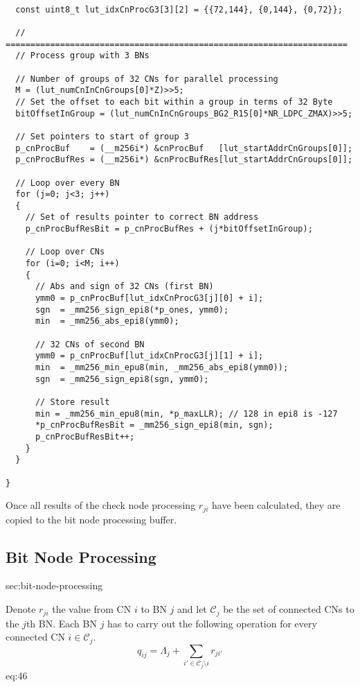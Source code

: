 \documentclass{article}
\def\Ccal{\mathcal{C}}
\begin{document}
\begin{lstlisting}[frame=single,caption={Example of CN processing for group 3 from \texttt{cnProc}.},label=code_cnproc]  % Start your code-block

  const uint8_t lut_idxCnProcG3[3][2] = {{72,144}, {0,144}, {0,72}};

  // =====================================================================
  // Process group with 3 BNs

  // Number of groups of 32 CNs for parallel processing
  M = (lut_numCnInCnGroups[0]*Z)>>5;
  // Set the offset to each bit within a group in terms of 32 Byte
  bitOffsetInGroup = (lut_numCnInCnGroups_BG2_R15[0]*NR_LDPC_ZMAX)>>5;

  // Set pointers to start of group 3
  p_cnProcBuf    = (__m256i*) &cnProcBuf   [lut_startAddrCnGroups[0]];
  p_cnProcBufRes = (__m256i*) &cnProcBufRes[lut_startAddrCnGroups[0]];

  // Loop over every BN
  for (j=0; j<3; j++)
  {
    // Set of results pointer to correct BN address
    p_cnProcBufResBit = p_cnProcBufRes + (j*bitOffsetInGroup);

    // Loop over CNs
    for (i=0; i<M; i++)
    {
      // Abs and sign of 32 CNs (first BN)
      ymm0 = p_cnProcBuf[lut_idxCnProcG3[j][0] + i];
      sgn  = _mm256_sign_epi8(*p_ones, ymm0);
      min  = _mm256_abs_epi8(ymm0);

      // 32 CNs of second BN
      ymm0 = p_cnProcBuf[lut_idxCnProcG3[j][1] + i];
      min  = _mm256_min_epu8(min, _mm256_abs_epi8(ymm0));
      sgn  = _mm256_sign_epi8(sgn, ymm0);

      // Store result
      min = _mm256_min_epu8(min, *p_maxLLR); // 128 in epi8 is -127
      *p_cnProcBufResBit = _mm256_sign_epi8(min, sgn);
      p_cnProcBufResBit++;
    }
  }

}
\end{lstlisting}

Once all results of the check node processing $r_{ji}$ have been calculated, they are copied to the bit node processing buffer.

\subsection{Bit Node Processing}{sec:bit-node-processing}

Denote $r_{ji}$ the value from CN $i$ to BN $j$ and let $\Ccal_j$ be the set of connected CNs to the $j$th BN. Each BN $j$ has to carry out the following operation for every connected CN $i\in\Ccal_j$.
\begin{equation}
  q_{ij} = \Lambda_j + \sum_{i'\in\Ccal_j\setminus i}r_{ji'}
\end{equation}{eq:46}
\end{document}
